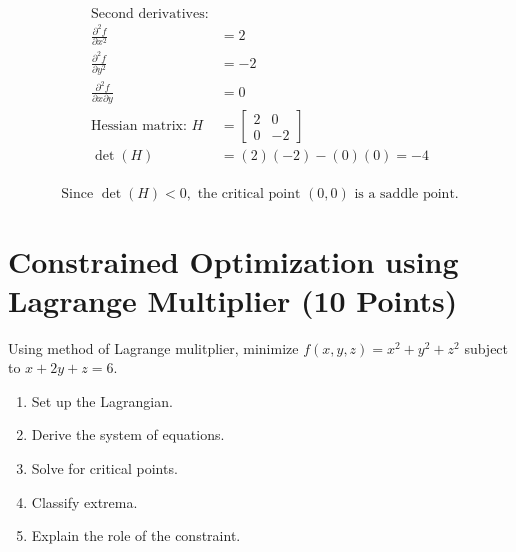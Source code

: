 \documentclass[12pt, xcolor=dvipsnames,svgnames,x11names]{article}
\begin{document}
\begin{answerbox}
\begin{enumerate}
\begin{align*}
\text{Second derivatives:} \\
\frac{\partial^2 f}{\partial x^2} &= 2 \\
\frac{\partial^2 f}{\partial y^2} &= -2 \\
\frac{\partial^2 f}{\partial x \partial y} &= 0 \\
\text{Hessian matrix: } H &= \begin{bmatrix}
2 & 0 \\
0 & -2
\end{bmatrix} \\
\det(H) &= (2)(-2) - (0)(0) = -4 \\
\end{align*}

$$\text{Since } \det(H) < 0, \text{ the critical point } (0, 0) \text{ is a saddle point.}$$
\end{enumerate}
\end{answerbox}

\section{Constrained Optimization using Lagrange Multiplier (10 Points)}
Using method of Lagrange mulitplier, minimize $f(x, y, z) = x^2 + y^2 + z^2$ subject to $x + 2y + z = 6$.

\begin{enumerate}
\item Set up the Lagrangian.
\item Derive the system of equations.
\item Solve for critical points.
\item Classify extrema.
\item Explain the role of the constraint.
\end{enumerate}
\end{document}
